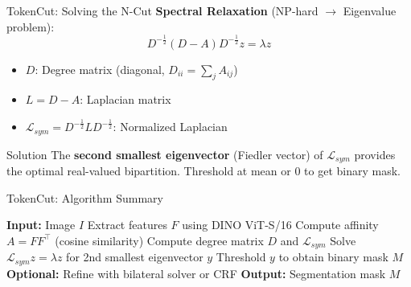 \documentclass[aspectratio=169]{beamer}
\begin{document}
\begin{frame}{TokenCut: Solving the N-Cut}
\textbf{Spectral Relaxation} (NP-hard $\rightarrow$ Eigenvalue problem):
\begin{equation}
D^{-\frac{1}{2}} (D - A) D^{-\frac{1}{2}} z = \lambda z
\end{equation}
\begin{itemize}
    \item $D$: Degree matrix (diagonal, $D_{ii} = \sum_j A_{ij}$)
    \item $L = D - A$: Laplacian matrix
    \item $\mathcal{L}_{sym} = D^{-\frac{1}{2}} L D^{-\frac{1}{2}}$: Normalized Laplacian
\end{itemize}
\vspace{0.5cm}
\begin{alertblock}{Solution}
The \textbf{second smallest eigenvector} (Fiedler vector) of $\mathcal{L}_{sym}$ provides the optimal real-valued bipartition. Threshold at mean or 0 to get binary mask.
\end{alertblock}
\end{frame}
\begin{frame}{TokenCut: Algorithm Summary}
\begin{algorithm}[H]
\caption{TokenCut}
\begin{algorithmic}[1]
\STATE \textbf{Input:} Image $I$
\STATE Extract features $F$ using DINO ViT-S/16
\STATE Compute affinity $A = F F^\top$ (cosine similarity)
\STATE Compute degree matrix $D$ and $\mathcal{L}_{sym}$
\STATE Solve $\mathcal{L}_{sym} z = \lambda z$ for 2nd smallest eigenvector $y$
\STATE Threshold $y$ to obtain binary mask $M$
\STATE \textbf{Optional:} Refine with bilateral solver or CRF
\STATE \textbf{Output:} Segmentation mask $M$
\end{algorithmic}
\end{algorithm}

\end{frame}
\end{document}
